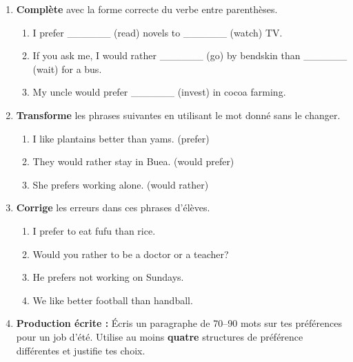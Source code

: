 \documentclass[11pt]{article}
\begin{document}
\begin{exercice}
\begin{enumerate}
\item \textbf{Complète} avec la forme correcte du verbe entre parenthèses.
\begin{enumerate}
\item I prefer \_\_\_\_\_\_ (read) novels to \_\_\_\_\_\_ (watch) TV.
\item If you ask me, I would rather \_\_\_\_\_\_ (go) by bendskin than \_\_\_\_\_\_ (wait) for a bus.
\item My uncle would prefer \_\_\_\_\_\_ (invest) in cocoa farming.
\end{enumerate}
\item \textbf{Transforme} les phrases suivantes en utilisant le mot donné sans le changer.
\begin{enumerate}
\item I like plantains better than yams. (prefer)
\item They would rather stay in Buea. (would prefer)
\item She prefers working alone. (would rather)
\end{enumerate}
\item \textbf{Corrige} les erreurs dans ces phrases d'élèves.
\begin{enumerate}
\item I prefer to eat fufu than rice.
\item Would you rather to be a doctor or a teacher?
\item He prefers not working on Sundays.
\item We like better football than handball.
\end{enumerate}
\item \textbf{Production écrite :} Écris un paragraphe de 70–90 mots sur tes préférences pour un job d'été. Utilise au moins \textbf{quatre} structures de préférence différentes et justifie tes choix.
\end{enumerate}
\end{exercice}
\end{document}
